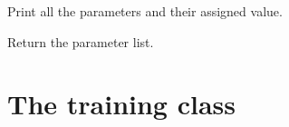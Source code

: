 \documentclass[letterpaper,10pt,english]{sphinxmanual}
\begin{document}
\begin{fulllineitems}
\begin{fulllineitems}
\end{fulllineitems}


\begin{fulllineitems}
\label{index:config.Config.cprint}
Print all the parameters and their assigned value.

\end{fulllineitems}


\begin{fulllineitems}
\label{index:config.Config.get_params}
Return the parameter list.

\end{fulllineitems}


\end{fulllineitems}



\section{The training class}
\label{index:the-training-class}\label{index:module-trainer}
\end{document}
